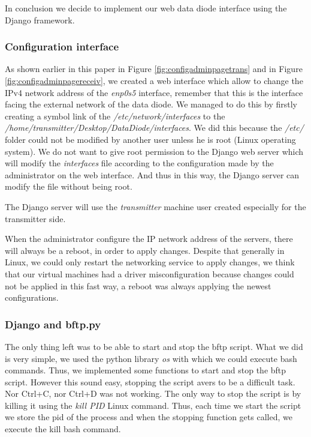 \documentclass[a4paper,10pt]{article}
\begin{document}
In conclusion we decide to implement our web data diode interface using the Django framework.

\subsubsection{Configuration interface}
As shown earlier in this paper in Figure \ref{fig:configadminpagetrans} and in Figure \ref{fig:configadminpagereceiv}, we created a web interface which allow to change the IPv4 network address of the \emph{enp0s5} interface, remember that this is the interface facing the external network of the data diode. We managed to do this by firstly creating a symbol link of the \emph{/etc/network/interfaces} to the \emph{/home/transmitter/Desktop/DataDiode/interfaces}. We did this because the \emph{/etc/} folder could not be modified by another user unless he is root (Linux operating system). We do not want to give root permission to the Django web server which will modify the \emph{interfaces} file according to the configuration made by the administrator on the web interface. And thus in this way, the Django server can modify the file without being root.

The Django server will use the \emph{transmitter} machine user created especially for the transmitter side.

When the administrator configure the IP network address of the servers, there will always be a reboot, in order to apply changes. Despite that generally in Linux, we could only restart the networking service to apply changes, we think that our virtual machines had a driver misconfiguration because changes could not be applied in this fast way, a reboot was always applying the newest configurations.

\subsubsection{Django and bftp.py}
The only thing left was to be able to start and stop the bftp script. What we did is very simple, we used the python library \emph{os} with which we could execute bash commands. Thus, we implemented some functions to start and stop the bftp script. However this sound easy, stopping the script avers to be a difficult task. Nor Ctrl+C, nor Ctrl+D was not working. The only way to stop the script is by killing it using the \emph{kill PID} Linux command. Thus, each time we start the script we store the pid of the process and when the stopping function gets called, we execute the kill bash command.
\end{document}
